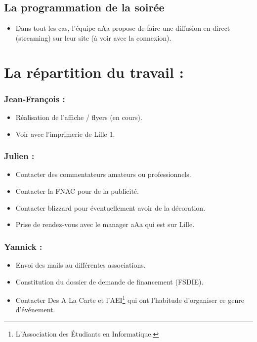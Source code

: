 \subsection{La programmation de la soirée}
\begin{itemize}
\item Dans tout les cas, l'équipe aAa propose de faire une diffusion en direct (streaming) sur leur site (à voir avec la connexion).
\end{itemize}

\section{La répartition du travail :}

\subsubsection{Jean-François :}
\begin{itemize}
\item Réalisation de l'affiche / flyers (en cours).
\item Voir avec l'imprimerie de Lille 1.
\end{itemize}

\subsubsection{Julien :}
\begin{itemize}
\item Contacter des commentateurs amateurs ou professionnels.
\item Contacter la FNAC pour de la publicité.
\item Contacter blizzard pour éventuellement avoir de la décoration.
\item Prise de rendez-vous avec le manager aAa qui est sur Lille.
\end{itemize}

\subsubsection{Yannick :}
\begin{itemize}
\item Envoi des mails au différentes associations.
\item Constitution du dossier de demande de financement (FSDIE).
\item Contacter \og Des A La Carte \fg{} et l'AEI\footnote{L'Association des Étudiants en Informatique.} qui ont l'habitude d'organiser ce genre d’événement.
\end{itemize}
